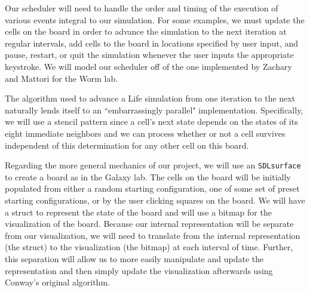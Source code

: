 \documentclass[12pt]{article}
\begin{document}

	Our scheduler will need to handle the order and timing of the execution of various events integral to our simulation. For some examples, we must update the cells on the board in order to advance the simulation to the next iteration at regular intervals, add cells to the board in locations specified by user input, and pause, restart, or quit the simulation whenever the user inputs the appropriate keystroke. We will model our scheduler off of the one implemented by Zachary and Mattori for the Worm lab.

	The algorithm used to advance a Life simulation from one iteration to the next naturally lends itself to an ``embarrassingly parallel" implementation. Specifically, we will use a stencil pattern since a cell's next state depends on the states of its eight immediate neighbors and we can process whether or not a cell survives independent of this determination for any other cell on this board. 

	Regarding the more general mechanics of our project, we will use an \texttt{SDL\underline{\hspace{3mm}}surface} to create a board as in the Galaxy lab. The cells on the board will be initially populated from either a random starting configuration, one of some set of preset starting configurations, or by the user clicking squares on the board. We will have a struct to represent the state of the board and will use a bitmap for the visualization of the board. Because our internal representation will be separate from our visualization, we will need to translate from the internal representation (the struct) to the visualization (the bitmap) at each interval of time. Further, this separation will allow us to more easily manipulate and update the representation and then simply update the visualization afterwards using Conway's original algorithm.









\end{document}
